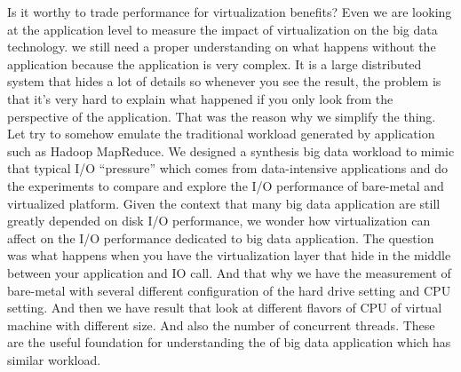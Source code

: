 \documentclass{acmsig}
\begin{document}
Is it worthy to trade performance for virtualization benefits? Even we are looking at the application level to measure the impact of virtualization on the big data technology. we still need a proper understanding on what happens without the application because the application is very complex. It is a large distributed system that hides a lot of details so whenever you see the result, the problem is that it's very hard to explain what happened if you only look from the perspective of the application. That was the reason why we simplify the thing. Let try to somehow emulate the traditional workload generated by application such as Hadoop MapReduce. We designed a synthesis big data workload to mimic that typical I/O ``pressure'' which comes from data-intensive applications and do the experiments to compare and explore the I/O performance of bare-metal and virtualized platform. Given the context that many big data application are still greatly depended on disk I/O performance, we wonder how virtualization can affect on the I/O performance dedicated to big data application. The question was what happens when you have the virtualization layer that hide in the middle between your application and IO call. And that why we have the measurement of bare-metal with several different configuration of the hard drive setting and CPU setting. And then we have result that look at different flavors of CPU of virtual machine with different size. And also the number of concurrent threads. These are the useful foundation for understanding the of big data application which has similar workload.

\end{document}
